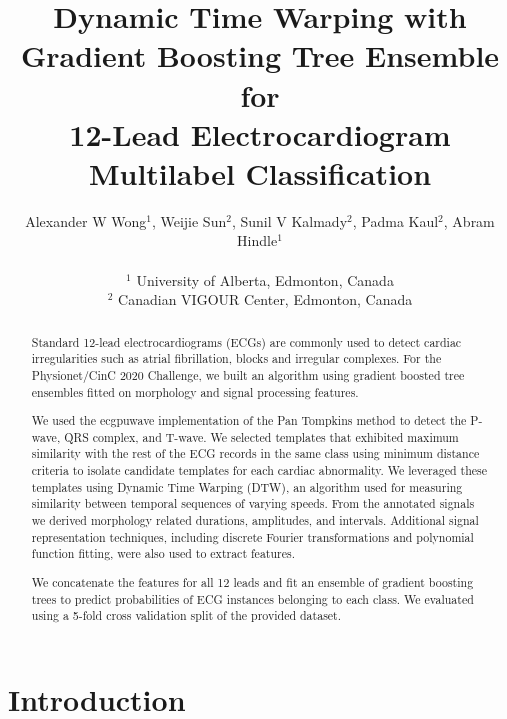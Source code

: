 \documentclass[twocolumn]{cinc}
\begin{document}


\title{Dynamic Time Warping with Gradient Boosting Tree Ensemble for \\
12-Lead Electrocardiogram Multilabel Classification}

\author {Alexander W Wong$^{1}$, Weijie Sun$^{2}$, Sunil V Kalmady$^{2}$, Padma Kaul$^{2}$, Abram Hindle$^{1}$\\
\ \\
 $^1$ University of Alberta, Edmonton, Canada \\
$^2$ Canadian VIGOUR Center, Edmonton, Canada }

\maketitle

\begin{abstract}

Standard 12-lead electrocardiograms (ECGs) are commonly used to detect cardiac irregularities such as atrial fibrillation, blocks and irregular complexes.
For the Physionet/CinC 2020 Challenge, we built an algorithm using gradient boosted tree ensembles fitted on morphology and signal processing features.

We used the ecgpuwave implementation of the Pan Tompkins method to detect the P-wave, QRS complex, and T-wave.
We selected templates that exhibited maximum similarity with the rest of the ECG records in the same class using minimum distance criteria to isolate candidate templates for each cardiac abnormality.
We leveraged these templates using Dynamic Time Warping (DTW), an algorithm used for measuring similarity between temporal sequences of varying speeds.
From the annotated signals we derived morphology related durations, amplitudes, and intervals.
Additional signal representation techniques, including discrete Fourier transformations and polynomial function fitting, were also used to extract features.

We concatenate the features for all 12 leads and fit an ensemble of gradient boosting trees to predict probabilities of ECG instances belonging to each class.
We evaluated using a 5-fold cross validation split of the provided dataset.

\end{abstract}

\section{Introduction}
\end{document}
